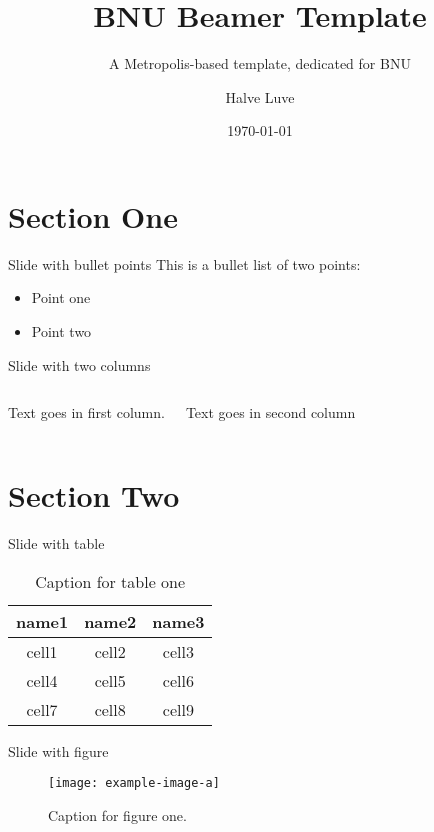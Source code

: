 \documentclass{beamer}
\title{BNU Beamer Template}
\subtitle{A Metropolis-based template, dedicated for BNU}
\date{\today}
\author{Halve Luve}
\institute{School of Artificial Intelligence, Beijing Normal University}
\begin{document}
    \maketitle
    \tableofcontents

    \section{Section One}
    \begin{frame}{Slide with bullet points}
        This is a bullet list of two points:
        \begin{itemize}
            \item Point one
            \item Point two
        \end{itemize}
    \end{frame}

    \begin{frame}{Slide with two columns}
        \begin{columns}
            Text goes in first column.
            
            Text goes in second column
        \end{columns}
    \end{frame}

    \section{Section Two}

    \begin{frame}{Slide with table}
        \begin{table}
            \centering
            \begin{tabular}{ccc}
                \hline
                \textbf{name1} & \textbf{name2} & \textbf{name3} \\
                \hline 
                cell1 & cell2 & cell3 \\ 
                cell4 & cell5 & cell6 \\ 
                cell7 & cell8 & cell9 \\ 
                \hline
            \end{tabular}
            \caption{Caption for table one}
            \label{tab:table1}
        \end{table}
    \end{frame}

    \begin{frame}{Slide with figure}
        \begin{figure}[H]
            \centering
            \texttt{[image: example-image-a]}
            \caption{Caption for figure one.}
            \label{fig:figure1}
        \end{figure}
    \end{frame}
\end{document}
